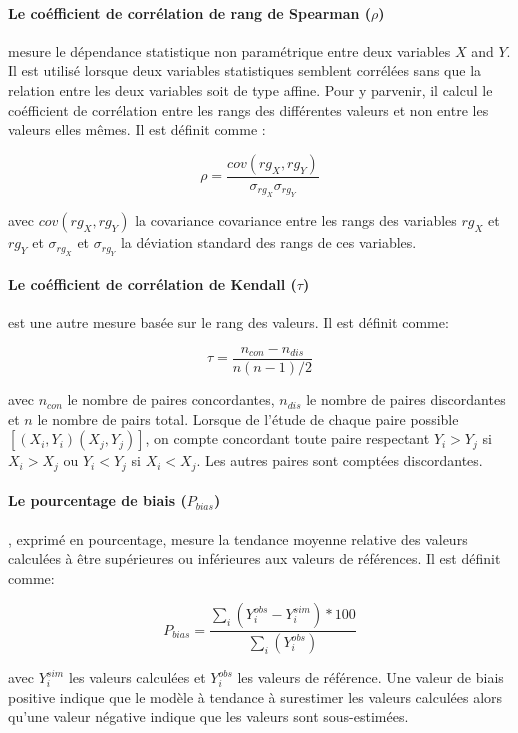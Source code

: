 \paragraph{ Le coéfficient de corrélation de rang de Spearman ($\rho$)}  mesure le dépendance statistique non paramétrique entre deux variables $X$ and $Y$. Il est utilisé lorsque deux variables statistiques semblent corrélées sans que la relation entre les deux variables soit de type affine. Pour y parvenir, il calcul le coéfficient de corrélation entre les rangs des différentes valeurs et non entre les valeurs elles mêmes. Il est définit comme :

\begin{equation}
    \rho = \frac{cov(rg_X,rg_Y)}{\sigma_{rg_X} \sigma_{rg_Y}}
\end{equation}

\noindent avec $cov(rg_X,rg_Y)$ la covariance covariance entre les rangs des variables $rg_X$ et $rg_Y$ et $\sigma_{rg_X}$ et $\sigma_{rg_Y}$ la déviation standard des rangs de ces variables. 

\paragraph{Le coéfficient de corrélation de Kendall ($\tau$)}  est une autre mesure basée sur le rang des valeurs. Il est définit comme:

\begin{equation}
    \tau = \frac{n_{con}-n_{dis}}{n(n-1)/2}
\end{equation}

\noindent avec $n_{con}$ le nombre de paires concordantes, $n_{dis}$ le nombre de paires discordantes et $n$ le nombre de pairs total. Lorsque de l'étude de chaque paire possible $[(X_i,Y_i)(X_j,Y_j)]$, on compte concordant toute paire respectant $Y_i>Y_j$ si $X_i>X_j$ ou $Y_i<Y_j$ si $X_i<X_j$. Les autres paires sont comptées discordantes.


\paragraph{Le pourcentage de biais ($P_{bias}$)}, exprimé en pourcentage, mesure la tendance moyenne relative des valeurs calculées à être supérieures ou inférieures aux valeurs de références. Il est définit comme:

\begin{equation}
    P_{bias} = \frac{\sum_i(Y_{i}^{obs}-Y_{i}^{sim})*100}{\sum_i(Y_{i}^{obs})}
\end{equation}

\noindent avec $Y_{i}^{sim}$ les valeurs calculées et $Y_{i}^{obs}$ les valeurs de référence. Une valeur de biais positive indique que le modèle à tendance à surestimer les valeurs calculées alors qu'une valeur négative indique que les valeurs sont sous-estimées.
